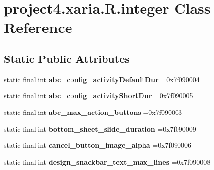 \hypertarget{classproject4_1_1xaria_1_1R_1_1integer}{}\section{project4.\+xaria.\+R.\+integer Class Reference}
\label{classproject4_1_1xaria_1_1R_1_1integer}
\subsection*{Static Public Attributes}
\begin{DoxyCompactItemize}
\item 
\mbox{\label{classproject4_1_1xaria_1_1R_1_1integer_ac3b713256531c58e00fa90c7ccdfe04f}} 
static final int {\bfseries abc\+\_\+config\+\_\+activity\+Default\+Dur} =0x7f090004
\item 
\mbox{\label{classproject4_1_1xaria_1_1R_1_1integer_a7ffa134ed96f08f8e0f718cc490d5157}} 
static final int {\bfseries abc\+\_\+config\+\_\+activity\+Short\+Dur} =0x7f090005
\item 
\mbox{\label{classproject4_1_1xaria_1_1R_1_1integer_aba72260e33aa6e5af116e77024a4b6cd}} 
static final int {\bfseries abc\+\_\+max\+\_\+action\+\_\+buttons} =0x7f090003
\item 
\mbox{\label{classproject4_1_1xaria_1_1R_1_1integer_a38b7bd65907211d1e038d3d9f2139d24}} 
static final int {\bfseries bottom\+\_\+sheet\+\_\+slide\+\_\+duration} =0x7f090009
\item 
\mbox{\label{classproject4_1_1xaria_1_1R_1_1integer_a0c1d10616123998b6329df8bc929e9dd}} 
static final int {\bfseries cancel\+\_\+button\+\_\+image\+\_\+alpha} =0x7f090006
\item 
\mbox{\label{classproject4_1_1xaria_1_1R_1_1integer_a96594d397f93214e278691dc15da1ebb}} 
static final int {\bfseries design\+\_\+snackbar\+\_\+text\+\_\+max\+\_\+lines} =0x7f090008
\item 
\mbox{\label{classproject4_1_1xaria_1_1R_1_1integer_a5a5e1a2e76183cbab64784928d2540b9}} 

\end{DoxyCompactItemize}
